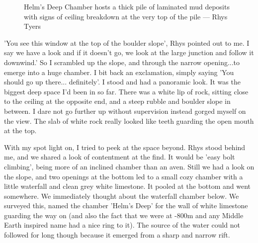 \begin{figure}[t!]
\checkoddpage \ifoddpage \forcerectofloat \else \forceversofloat \fi
\centering
{}
\caption{Helm's Deep Chamber hosts a thick pile of laminated mud deposits with signs of ceiling breakdown at the very top of the pile --- Rhys Tyers}
\label{helmsdeeo}
\end{figure}

'You see this window at the top of the boulder slope', Rhys pointed out to me. I say we have a look and if it doesn't go, we look at the large junction and follow it downwind.' So I scrambled up the slope, and through the narrow opening...to emerge into a huge chamber. I bit back an exclamation, simply saying 'You should go up there... definitely'. I stood and had a panoramic look. It was the biggest deep space I'd been in so far. There was a white lip of rock, sitting close to the ceiling at the opposite end, and a steep rubble and boulder slope in between. I dare not go further up without supervision instead gorged myself on the view. The slab of white rock really looked like teeth guarding the open mouth at the top. 

With my spot light on, I tried to peek at the space beyond. Rhys stood behind me, and we shared a look of contentment at the find. It would be 'easy bolt climbing', being more of an inclined chamber than an aven. Still we had a look on the slope, and two openings at the bottom led to a small cozy chamber with a little waterfall and clean grey white limestone. It pooled at the bottom and went somewhere. We immediately thought about the waterfall chamber below. We surveyed this, named the chamber 'Helm's Deep' for the wall of white limestone guarding the way on (and also the fact that we were at -800m and any Middle Earth inspired name had a nice ring to it). The source of the water could not followed for long though because it emerged from a sharp and narrow rift. 

